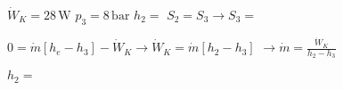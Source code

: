 \( \dot{W}_K = 28 \, \text{W} \)  
\( p_3 = 8 \, \text{bar} \)  
\( h_2 = \)  
\( S_2 = S_3 \rightarrow S_3 = \)  

\( 0 = \dot{m}[h_e - h_3] - \dot{W}_K \rightarrow \dot{W}_K = \dot{m}[h_2 - h_3] \)  
\( \rightarrow \dot{m} = \frac{\dot{W}_K}{h_2 - h_3} \)  

\( h_2 = \)